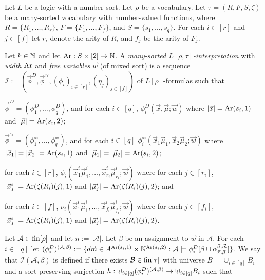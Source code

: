 \documentclass[../main/thesis.tex]{subfiles}
\begin{document}
\begin{definition}
  Let $L$ be a logic with a number sort. Let $\rho$ be a vocabulary. Let $\tau =
  (R, F, S, \zeta)$ be a many-sorted vocabulary with number-valued functions,
  where $R = \{R_1, \ldots, R_{r}\}$, $F = \{ F_1, \ldots, F_{f} \}$, and $S =
  \{s_1, \ldots, s_{q}\}$. For each $i \in [r]$ and $j \in [f]$ let $r_i$ denote
  the arity of $R_i$ and $f_j$ be the arity of $F_j$.

  Let $k \in \mathbb{N}$ and let $\text{\upshape Ar} : S \times [2] \rightarrow \mathbb{N}$. A \emph{many-sorted
    $L [\rho, \tau]$-interpretation} with \emph{width} $\text{\upshape Ar}$ and \emph{free
    variables} $\vec{w}$ (of mixed sort) is a sequence $\mathcal{I} :=
  (\vec{\phi}^D, \vec{\phi}^{\approx}, (\phi_i)_{i \in [r]}, (\eta_j)_{j \in
    [f]})$ of $L[\rho]$-formulas such that
  \begin{myenum}
  \item $\vec{\phi}^D = (\phi^D_1, \ldots, \phi^D_q)$, and for each $i \in [q]$,
    $\phi^D_i(\vec{x}, \vec{\mu}; \vec{w})$ where $\vert \vec{x} \vert =
    \text{\upshape Ar}(s_i, 1)$ and $\vert \vec{\mu} \vert = \text{\upshape Ar}(s_i, 2)$;
  \item $\vec{\phi}^{\approx} = (\phi^{\approx}_1, \ldots, \phi^{\approx}_q)$,
    and for each $i \in [q]$ $\phi^{\approx}_i(\vec{x}_1\vec{\mu}_1, \vec{x}_2
    \vec{\mu}_2 ; \vec{w})$ where $\vert \vec{x}_1 \vert = \vert \vec{x}_2 \vert
    = \text{\upshape Ar}(s_i, 1)$ and $\vert \vec{\mu}_1 \vert = \vert \vec{\mu}_2 \vert =
    \text{\upshape Ar}(s_i, 2)$;
  \item for each $i \in [r]$, $\phi_i (\vec{x}^i_1 \vec{\mu}^i_1, \ldots,
    \vec{x}^{i}_{r_i} \vec{\mu}^{i}_{r_i} ; \vec{w})$ where for each $j \in
    [r_i]$, $\vert \vec{x}^i_j\vert = \text{\upshape Ar}(\zeta(R_i)(j), 1)$ and $\vert
    \vec{\mu}^i_j \vert = \text{\upshape Ar}(\zeta(R_i)(j), 2)$; and
  \item for each $i \in [f]$, $\nu_i (\vec{x}^i_1 \vec{\mu}^i_1, \ldots,
    \vec{x}^{i}_{f_i} \vec{\mu}^{i}_{f_i} ; \vec{w})$ where for each $j \in
    [f_i]$, $\vert \vec{x}^i_j \vert = \text{\upshape Ar}(\zeta(R_i)(j), 1)$ and $\vert
    \vec{\mu}^i_j \vert = \text{\upshape Ar}(\zeta(R_i)(j), 2)$.
  \end{myenum}

  Let $\mathcal{A} \in \text{\upshape fin}[\rho]$ and let $n := \vert \mathcal{A} \vert$. Let
  $\beta$ be an assignment to $\vec{w}$ in $\mathcal{A}$. For each $i \in [q]$
  let $(\phi^D_i)^{(\mathcal{A}, \beta)} := \{ \vec{a}\vec{m} \in A^{\text{\upshape Ar}(s_i,
    1)} \times \mathbb{N}^{\text{\upshape Ar}(s_i, 2)}: \mathcal{A} \models \phi^D_i[\beta \cup
  \alpha^{\vec{a}, \vec{m}}_{\vec{x}, \vec{\mu}}] \}$. We say that $\mathcal{I}
  (\mathcal{A}, \beta)$ is defined if there exists $\mathcal{B} \in \text{\upshape fin}[\tau]$
  with universe $B = \uplus_{i \in [q]} B_i$ and a sort-preserving surjection $h
  : \uplus_{i \in [q]} (\phi^D_i)^{(\mathcal{A}, \beta)} \rightarrow \uplus_{i \in [q]}
  B_i$ such that
    

\end{definition}
\end{document}
